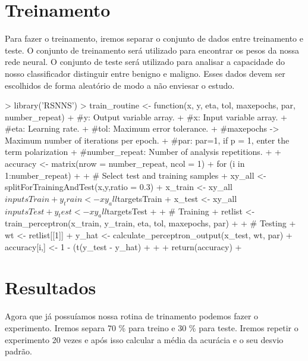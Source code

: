 \documentclass[12pt]{article}
\begin{document}
\section{Treinamento}

  \par Para fazer o treinamento, iremos separar o conjunto de dados entre treinamento e teste. O conjunto de treinamento será utilizado para encontrar os pesos da nossa rede neural. O conjunto de teste será utilizado para analisar a capacidade do nosso classificador distinguir entre benigno e maligno. Esses dados devem ser escolhidos de forma aleatório de modo a não enviesar o estudo.
  
\begin{Schunk}
\begin{Sinput}
> library('RSNNS')
> train_routine <- function(x, y, eta, tol, maxepochs, par, number_repeat){
+   #y: Output variable array. 
+   #x: Input variable array.
+   #eta: Learning rate.
+   #tol: Maximum error tolerance.
+   #maxepochs -> Maximum number of iterations per epoch.
+   #par: par=1, if p = 1, enter the term polarization
+   #number_repeat: Number of analysis repetitions.
+   
+ accuracy <- matrix(nrow = number_repeat, ncol = 1)
+ for (i in 1:number_repeat)
+ {
+   # Select test and training samples
+   xy_all <- splitForTrainingAndTest(x,y,ratio = 0.3)
+   x_train <- xy_all$inputsTrain
+   y_train <- xy_all$targetsTrain
+   x_test <- xy_all$inputsTest
+   y_test <- xy_all$targetsTest
+   
+   # Training
+   retlist <- train_perceptron(x_train, y_train, eta, tol, maxepochs, par)
+   
+   # Testing
+   wt <- retlist[[1]]
+   y_hat <- calculate_perceptron_output(x_test, wt, par)
+   accuracy[i,] <- 1 - (t(y_test - y_hat) %*% (y_test - y_hat))/length(y_test)
+ }
+   
+ return(accuracy)
+ }
\end{Sinput}
\end{Schunk}

\section{Resultados}
  \par Agora que já possuíamos nossa rotina de trinamento podemos fazer o experimento. Iremos separa 70 \% para treino e 30 \% para teste. Iremos repetir o experimento 20 vezes e após isso calcular a média da acurácia e o seu desvio padrão.
  
\end{document}

